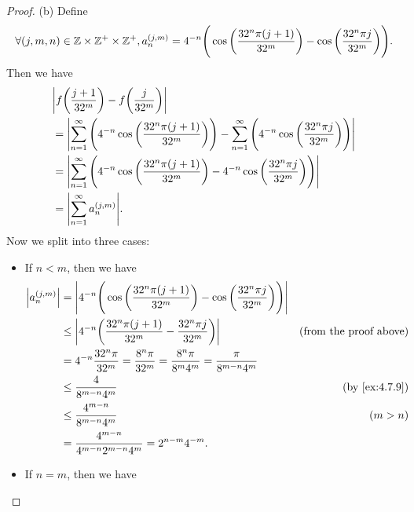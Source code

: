\begin{proof}{(b)}
  Define
  \[
    \forall (j, m, n) \in \mathbb{Z} \times \mathbb{Z}^+ \times \mathbb{Z}^+, a_n^{(j, m)} = 4^{-n} \Bigg(\cos\bigg(\frac{32^n \pi (j + 1)}{32^m}\bigg) - \cos\bigg(\frac{32^n \pi j}{32^m}\bigg)\Bigg).
  \]
  Then we have
  \begin{align*}
     & \abs{f\bigg(\frac{j + 1}{32^m}\bigg) - f\bigg(\frac{j}{32^m}\bigg)}                                                                                                           \\
     & = \abs{\sum_{n = 1}^\infty \Bigg(4^{-n} \cos\bigg(\frac{32^n \pi (j + 1)}{32^m}\bigg)\Bigg) - \sum_{n = 1}^\infty \Bigg(4^{-n} \cos\bigg(\frac{32^n \pi j}{32^m}\bigg)\Bigg)} \\
     & = \abs{\sum_{n = 1}^\infty \Bigg(4^{-n} \cos\bigg(\frac{32^n \pi (j + 1)}{32^m}\bigg) - 4^{-n} \cos\bigg(\frac{32^n \pi j}{32^m}\bigg)\Bigg)}                                 \\
     & = \abs{\sum_{n = 1}^\infty a_n^{(j, m)}}.
  \end{align*}
  Now we split into three cases:
  \begin{itemize}
    \item If \(n < m\), then we have
          \begin{align*}
            \abs{a_n^{(j, m)}} & = \abs{4^{-n} \Bigg(\cos\bigg(\frac{32^n \pi (j + 1)}{32^m}\bigg) - \cos\bigg(\frac{32^n \pi j}{32^m}\bigg)\Bigg)}                                 \\
                               & \leq \abs{4^{-n} \bigg(\frac{32^n \pi (j + 1)}{32^m} - \frac{32^n \pi j}{32^m}\bigg)}                              & \text{(from the proof above)} \\
                               & = 4^{-n} \frac{32^n \pi}{32^m} = \frac{8^n \pi}{32^m} = \frac{8^n \pi}{8^m 4^m} = \frac{\pi}{8^{m - n} 4^m}                                        \\
                               & \leq \frac{4}{8^{m - n} 4^m}                                                                                       & \text{(by \cref{ex:4.7.9})}   \\
                               & \leq \frac{4^{m - n}}{8^{m - n} 4^m}                                                                               & (m > n)                       \\
                               & = \frac{4^{m - n}}{4^{m - n} 2^{m - n} 4^m} = 2^{n - m} 4^{-m}.
          \end{align*}
    \item If \(n = m\), then we have

\end{itemize}
\end{proof}
